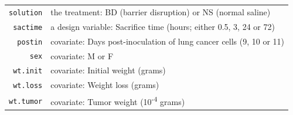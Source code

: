 \documentclass[]{book}
\theoremstyle{definition}
\theoremstyle{definition}
\theoremstyle{definition}
\theoremstyle{remark}
\begin{document}
\begin{longtable}[]{@{}rl@{}}
\begin{minipage}[t]{0.12\columnwidth}
\texttt{solution}\strut
\end{minipage} & \begin{minipage}[t]{0.59\columnwidth}\raggedright\strut
the treatment: BD (barrier disruption) or NS (normal saline)\strut
\end{minipage}\tabularnewline
\begin{minipage}[t]{0.12\columnwidth}\raggedleft\strut
\texttt{sactime}\strut
\end{minipage} & \begin{minipage}[t]{0.59\columnwidth}\raggedright\strut
a design variable: Sacrifice time (hours; either 0.5, 3, 24 or 72)\strut
\end{minipage}\tabularnewline
\begin{minipage}[t]{0.12\columnwidth}\raggedleft\strut
\texttt{postin}\strut
\end{minipage} & \begin{minipage}[t]{0.59\columnwidth}\raggedright\strut
covariate: Days post-inoculation of lung cancer cells (9, 10 or
11)\strut
\end{minipage}\tabularnewline
\begin{minipage}[t]{0.12\columnwidth}\raggedleft\strut
\texttt{sex}\strut
\end{minipage} & \begin{minipage}[t]{0.59\columnwidth}\raggedright\strut
covariate: M or F\strut
\end{minipage}\tabularnewline
\begin{minipage}[t]{0.12\columnwidth}\raggedleft\strut
\texttt{wt.init}\strut
\end{minipage} & \begin{minipage}[t]{0.59\columnwidth}\raggedright\strut
covariate: Initial weight (grams)\strut
\end{minipage}\tabularnewline
\begin{minipage}[t]{0.12\columnwidth}\raggedleft\strut
\texttt{wt.loss}\strut
\end{minipage} & \begin{minipage}[t]{0.59\columnwidth}\raggedright\strut
covariate: Weight loss (grams)\strut
\end{minipage}\tabularnewline
\begin{minipage}[t]{0.12\columnwidth}\raggedleft\strut
\texttt{wt.tumor}\strut
\end{minipage} & \begin{minipage}[t]{0.59\columnwidth}\raggedright\strut
covariate: Tumor weight (10\textsuperscript{-4} grams)\strut
\end{minipage}\tabularnewline
\bottomrule
\end{longtable}
\end{document}
